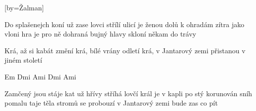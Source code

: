 [by={Žalman}]

\beginverse{}
Do splašenejch koní už zase lovci střílí
ulicí je ženou dolů k ohradám
zítra jako vloni hra je pro ně dohraná
bujný hlavy skloní někam do trávy
\endverse{}

\beginchorus{}
Krá, až si kabát změní
krá, bílé vrány odletí 
krá, v Jantarový zemi 
přistanou v jiném století
\endchorus{}

\beginverse*{}
Em Dmi Ami Dmi Ami
\endverse{}

\beginverse{}
Zamčený jsou stáje kat už hřívy stříhá
lovčí král je v kapli po stý korunován
sníh pomalu taje těla stromů se probouzí
v Jantarový zemi bude zas co pít
\endverse{}

\endsong{}
